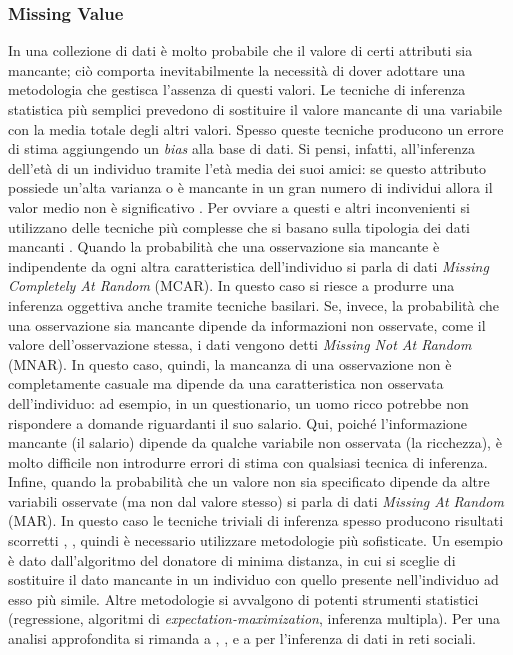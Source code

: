 \subsubsection{Missing Value}
\label{subsec:missing_value}
In una collezione di dati \`e molto probabile che il valore di certi attributi sia mancante; ci\`o comporta inevitabilmente la necessit\`a di dover adottare una metodologia che gestisca l'assenza di questi valori. Le tecniche di inferenza statistica pi\`u semplici prevedono di sostituire il valore mancante di una variabile con la media totale degli altri valori. Spesso queste tecniche producono un errore di stima aggiungendo un \textit{bias} alla base di dati. Si pensi, infatti, all'inferenza dell'et\`a di un individuo tramite l'et\`a media dei suoi amici: se questo attributo possiede un'alta varianza o \`e mancante in un gran numero di individui allora il valor medio non \`e significativo \cite{rubin1987}. Per ovviare a questi e altri inconvenienti si utilizzano delle tecniche pi\`u complesse che si basano sulla tipologia dei dati mancanti \cite{Donders2006}. Quando la probabilit\`a che una osservazione sia mancante \`e indipendente da ogni altra caratteristica dell'individuo si parla di dati \textit{Missing Completely At Random} (MCAR). In questo caso si riesce a produrre una inferenza oggettiva anche tramite tecniche basilari. Se, invece, la probabilit\`a che una osservazione sia mancante dipende da informazioni non osservate, come il valore dell'osservazione stessa, i dati vengono detti \textit{Missing Not At Random} (MNAR). In questo caso, quindi, la mancanza di una osservazione non \`e completamente casuale ma  dipende da una caratteristica non osservata dell'individuo: ad esempio, in un questionario, un uomo ricco potrebbe non rispondere a domande riguardanti il suo salario. Qui, poich\'e l'informazione mancante (il salario) dipende da qualche variabile non osservata (la ricchezza), \`e molto difficile non introdurre errori di stima con qualsiasi tecnica di inferenza. Infine, quando la probabilit\`a che un valore non sia specificato dipende da altre variabili osservate (ma non dal valore stesso) si parla di dati \textit{Missing At Random} (MAR). In questo caso le tecniche triviali di inferenza spesso producono risultati scorretti \cite{Greenland1995}, \cite{Vach1994}, quindi \`e necessario utilizzare metodologie pi\`u sofisticate. Un esempio \`e dato dall'algoritmo del donatore di minima distanza, in cui si sceglie di sostituire il dato mancante in un individuo con quello presente nell'individuo ad esso pi\`u simile.
Altre metodologie si avvalgono di potenti strumenti statistici (regressione, algoritmi di \textit{expectation-maximization}, inferenza multipla). Per una analisi approfondita si rimanda a \cite{Little1986}, \cite{Schafer1997}, \cite{rubin1987} e a \cite{Kossinets2003} per l'inferenza di dati in reti sociali.


